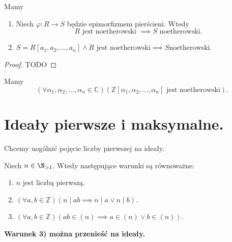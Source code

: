 \begin{theorem}
	Mamy

	\begin{enumerate}[label=\arabic*)]
		\item Niech $\varphi : R \to S $ będzie epimorfizmem pierścieni. Wtedy 
			 \[
			R\text{ jest noetherowski }\implies S\text{ noetherowski}
			.\] 
		\item $S = R\left[ a_1,a_2,\ldots,a_{n}  \right] \land R \text{ jest noetherowski} \implies S \text{noetherowski}$.
	\end{enumerate}
\end{theorem} 
\begin{proof}
	TODO
\end{proof} 
\begin{corollary}

	Mamy
	\[
	\left(\forall \alpha_1, \alpha_2,\ldots,\alpha_{n} \in \mathbb{C}  \right)\left( \mathbb{Z} \left[ \alpha_1,\alpha_2,\ldots,\alpha_{n}  \right] \text{ jest noetherowski} \right)  
	.\] 
\end{corollary}
\section{Ideały pierwsze i maksymalne.}
Chcemy uogólnić pojęcie liczby pierwszej na ideały.

Niech $n\in \N_{>1}$. Wtedy następujące warunki są równoważne:
\begin{enumerate}[label=\arabic*)]
	\item $n$ jest liczbą pierwszą.
	\item $\left(\forall a,b \in \mathbb{Z}  \right)\left( n\mid ab \implies n\mid a \lor n\mid b \right)  $.
	\item $\left(\forall a,b \in \mathbb{Z}  \right)\left( ab \in \left( n \right) \implies a\in \left( n \right) \lor b \in \left( n \right)  \right)  $.
\end{enumerate}
\textbf{Warunek 3) można przenieść na ideały.}


